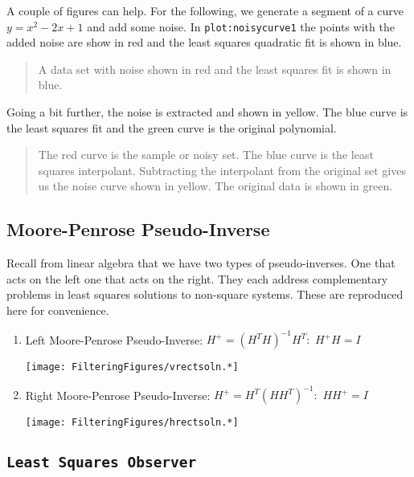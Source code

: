 A couple of figures can help. For the following, we generate a segment
of a curve \(y=x^2-2x+1\) and add some noise. In
\texttt{plot:noisycurve1} the points with the added noise are show in
red and the least squares quadratic fit is shown in blue.

\begin{quote}
A data set with noise shown in red and the least squares fit is shown in
blue.
\end{quote}

Going a bit further, the noise is extracted and shown in yellow. The
blue curve is the least squares fit and the green curve is the original
polynomial.

\begin{quote}
The red curve is the sample or noisy set. The blue curve is the least
squares interpolant. Subtracting the interpolant from the original set
gives us the noise curve shown in yellow. The original data is shown in
green.
\end{quote}

\hypertarget{moore-penrose-pseudo-inverse}{%
\subsection{Moore-Penrose
Pseudo-Inverse}\label{moore-penrose-pseudo-inverse}}

Recall from linear algebra that we have two types of pseudo-inverses.
One that acts on the left one that acts on the right. They each address
complementary problems in least squares solutions to non-square systems.
These are reproduced here for convenience.

\begin{enumerate}
\item
  Left Moore-Penrose Pseudo-Inverse:
  \(H^+ = \left(H^TH\right)^{-1} H^T :\) \(H^+ H =I\)

  \texttt{[image: FilteringFigures/vrectsoln.*]}
\item
  Right Moore-Penrose Pseudo-Inverse:
  \(H^+ = H^T \left(HH^T\right)^{-1}:\) \(H H^+ =I\)

  \texttt{[image: FilteringFigures/hrectsoln.*]}
\end{enumerate}

\hypertarget{least-squares-observer}{%
\subsection{\texorpdfstring{\texttt{Least\ Squares\ Observer}}{Least Squares Observer}}\label{least-squares-observer}}

